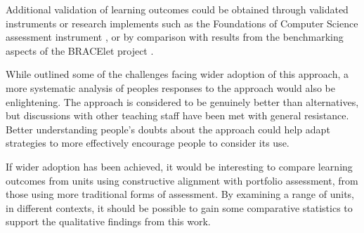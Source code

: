 Additional validation of learning outcomes could be obtained through validated instruments or research implements such as the Foundations of Computer Science assessment instrument \citep{Tew:2011}, or by comparison with results from the benchmarking aspects of the BRACElet project \citep{Clear:2008}. 

While  outlined some of the challenges facing wider adoption of this approach, a more systematic analysis of peoples responses to the approach would also be enlightening. The approach is considered to be genuinely better than alternatives, but discussions with other teaching staff have been met with general resistance. Better understanding people's doubts about the approach could help adapt strategies to more effectively encourage people to consider its use.

If wider adoption has been achieved, it would be interesting to compare learning outcomes from units using constructive alignment with portfolio assessment, from those using more traditional forms of assessment. By examining a range of units, in different contexts, it should be possible to gain some comparative statistics to support the qualitative findings from this work.



